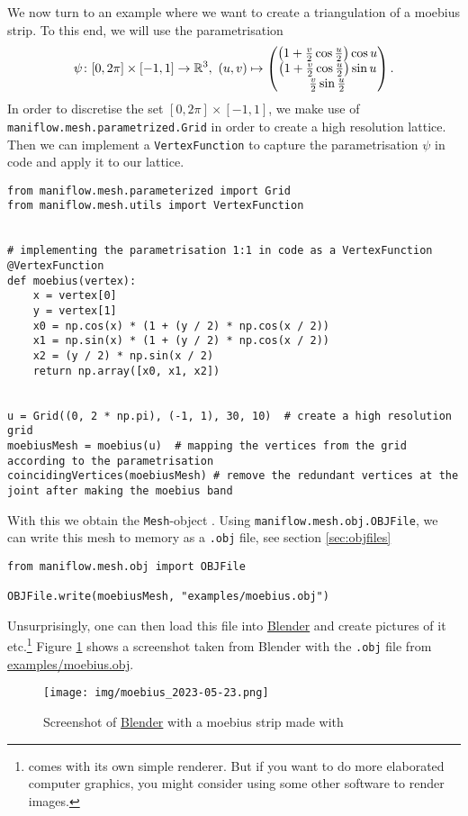 \begin{ex}\label{ex:moebius_creation}
We now turn to an example where we want to create a triangulation of a moebius strip. To this end, we will use the parametrisation
\begin{align*}
    \psi\colon [0, 2\pi]\times [-1,1]\to\R^3,\ (u,v)\mapsto\begin{pmatrix}
        \left(1+\frac{v}{2}\cos{\frac{u}{2}}\right)\cos{u}\\
        \left(1+\frac{v}{2}\cos{\frac{u}{2}}\right)\sin{u}\\
        \frac{v}{2}\sin{\frac{u}{2}}
    \end{pmatrix}.
\end{align*}
In order to discretise the set $[0,2\pi]\times[-1,1]$, we make use of \texttt{maniflow.mesh.parametrized.Grid} in order to create a high resolution lattice. Then we can implement a \texttt{VertexFunction} to capture the parametrisation $\psi$ in code and apply it to our lattice.
\begin{lstlisting}
from maniflow.mesh.parameterized import Grid
from maniflow.mesh.utils import VertexFunction


# implementing the parametrisation 1:1 in code as a VertexFunction
@VertexFunction
def moebius(vertex):
    x = vertex[0]
    y = vertex[1]
    x0 = np.cos(x) * (1 + (y / 2) * np.cos(x / 2))
    x1 = np.sin(x) * (1 + (y / 2) * np.cos(x / 2))
    x2 = (y / 2) * np.sin(x / 2)
    return np.array([x0, x1, x2])


u = Grid((0, 2 * np.pi), (-1, 1), 30, 10)  # create a high resolution grid
moebiusMesh = moebius(u)  # mapping the vertices from the grid according to the parametrisation
coincidingVertices(moebiusMesh) # remove the redundant vertices at the joint after making the moebius band
\end{lstlisting}
With this we obtain the \texttt{Mesh}-object . Using \texttt{maniflow.mesh.obj.OBJFile}, we can write this mesh to memory as a \texttt{.obj} file, see section \ref{sec:objfiles}
\begin{lstlisting}
from maniflow.mesh.obj import OBJFile

OBJFile.write(moebiusMesh, "examples/moebius.obj")
\end{lstlisting}
Unsurprisingly, one can then load this file into \href{https://www.blender.org/}{Blender} and create pictures of it etc.\footnote{\maniflow{} comes with its own simple renderer. But if you want to do more elaborated computer graphics, you might consider using some other software to render images.} Figure \ref{fig:moubius_blender} shows a screenshot taken from Blender with the \texttt{.obj} file from \href{https://gitlab.gwdg.de/yangshan.xiang/scientific-computing/-/blob/82c42c864b3e46303b208b78720b8109116c78da/examples/moebius.obj}{\url{examples/moebius.obj}}.
\end{ex}
\begin{figure}[t]
    \centering
    \texttt{[image: img/moebius\_2023-05-23.png]}
    \caption{Screenshot of \href{https://www.blender.org/}{Blender} with a moebius strip made with \maniflow{}}
    \label{fig:moubius_blender}
\end{figure}
\newpage
